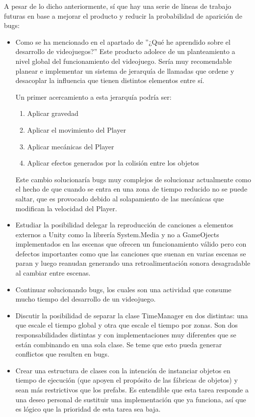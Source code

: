 A pesar de lo dicho anteriormente, sí que hay una serie de líneas de trabajo futuras en base a mejorar el producto y reducir la probabilidad de aparición de bugs:

\begin{itemize}
\item
Como se ha mencionado en el apartado de ''¿Qué he aprendido sobre el desarrollo de videojuegos?'' Este producto adolece de un planteamiento a nivel global del funcionamiento del videojuego. Sería muy recomendable planear e implementar un sistema de jerarquía de llamadas que ordene y desacoplar la influencia que tienen distintos elementos entre sí.

Un primer acercamiento a esta jerarquía podría ser:
\begin{enumerate}
\item
Aplicar gravedad
\item
Aplicar el movimiento del Player
\item
Aplicar mecánicas del Player
\item
Aplicar efectos generados por la colisión entre los objetos
\end{enumerate}

Este cambio solucionaría bugs muy complejos de solucionar actualmente como el hecho de que cuando se entra en una zona de tiempo reducido no se puede saltar, que es provocado debido al solapamiento de las mecánicas que modifican la velocidad del Player.

\item
Estudiar la posibilidad delegar la reproducción de canciones a elementos externos a Unity como la librería System.Media y no a GameOjects implementados en las escenas que ofrecen un funcionamiento válido pero con defectos importantes como que las canciones que suenan en varias escenas se paran y luego reanudan generando una retroalimentación sonora desagradable al cambiar entre escenas.

\item
Continuar solucionando bugs, los cuales son una actividad que consume mucho tiempo del desarrollo de un videojuego.

\item
Discutir la posibilidad de separar la clase TimeManager en dos distintas: una que escale el tiempo global y otra que escale el tiempo
por zonas. Son dos responsabilidades distintas y con implementaciones muy diferentes que se están combinando en una sola clase. Se teme que esto pueda generar conflictos que resulten en bugs.

\item
Crear una estructura de clases con la intención de instanciar objetos en tiempo de ejecución (que apoyen el propósito de las fábricas de objetos) y sean más restrictivos que los prefabs. Es entendible que esta tarea responde a una deseo personal de sustituir una implementación que ya funciona, así que es lógico que la prioridad de esta tarea sea baja.
\end{itemize}
